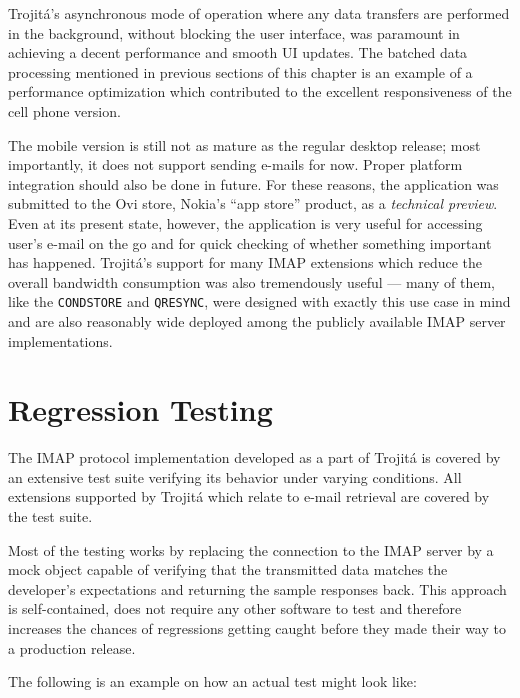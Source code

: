 \documentclass[trojita]{subfiles}
\begin{document}
Trojitá's asynchronous mode of operation where any data transfers are performed in the background, without blocking the
user interface, was paramount in achieving a decent performance and smooth UI updates.  The batched data processing
mentioned in previous sections of this chapter is an example of a performance optimization which contributed to the
excellent responsiveness of the cell phone version.

The mobile version is still not as mature as the regular desktop release; most importantly, it does not support sending
e-mails for now.  Proper platform integration should also be done in future.  For these reasons, the application was
submitted to the Ovi store, Nokia's ``app store'' product, as a {\em technical preview}.  Even at its present state,
however, the application is very useful for accessing user's e-mail on the go and for quick checking of whether
something important has happened.  Trojitá's support for many IMAP extensions which reduce the overall bandwidth
consumption was also tremendously useful --- many of them, like the {\tt CONDSTORE} and {\tt QRESYNC}, were designed
with exactly this use case in mind and are also reasonably wide deployed among the publicly available IMAP server
implementations.

\section{Regression Testing}

The IMAP protocol implementation developed as a part of Trojitá is covered by an extensive test suite verifying its
behavior under varying conditions.  All extensions supported by Trojitá which relate to e-mail retrieval are covered by
the test suite.

Most of the testing works by replacing the connection to the IMAP server by a mock object capable of verifying that the
transmitted data matches the developer's expectations and returning the sample responses back.  This approach is
self-contained, does not require any other software to test and therefore increases the chances of regressions getting
caught before they made their way to a production release.

The following is an example on how an actual test might look like:
\end{document}
